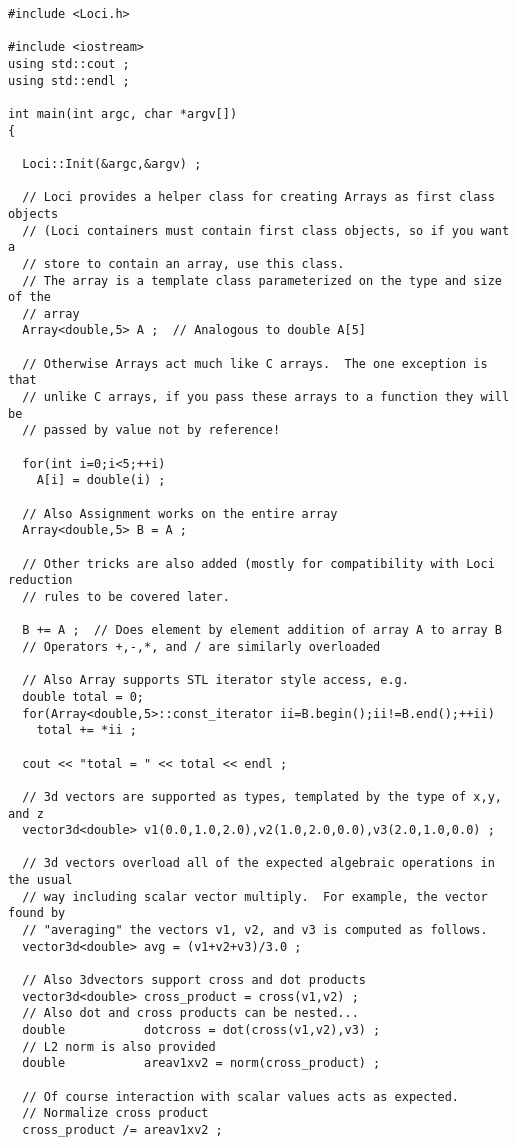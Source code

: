 \begin{verbatim}
#include <Loci.h>

#include <iostream>
using std::cout ;
using std::endl ;

int main(int argc, char *argv[])
{

  Loci::Init(&argc,&argv) ;
  
  // Loci provides a helper class for creating Arrays as first class objects
  // (Loci containers must contain first class objects, so if you want a
  // store to contain an array, use this class.
  // The array is a template class parameterized on the type and size of the
  // array
  Array<double,5> A ;  // Analogous to double A[5] 

  // Otherwise Arrays act much like C arrays.  The one exception is that
  // unlike C arrays, if you pass these arrays to a function they will be
  // passed by value not by reference!

  for(int i=0;i<5;++i)
    A[i] = double(i) ;

  // Also Assignment works on the entire array
  Array<double,5> B = A ;

  // Other tricks are also added (mostly for compatibility with Loci reduction
  // rules to be covered later.

  B += A ;  // Does element by element addition of array A to array B
  // Operators +,-,*, and / are similarly overloaded

  // Also Array supports STL iterator style access, e.g.
  double total = 0;
  for(Array<double,5>::const_iterator ii=B.begin();ii!=B.end();++ii)
    total += *ii ;

  cout << "total = " << total << endl ;

  // 3d vectors are supported as types, templated by the type of x,y, and z
  vector3d<double> v1(0.0,1.0,2.0),v2(1.0,2.0,0.0),v3(2.0,1.0,0.0) ;

  // 3d vectors overload all of the expected algebraic operations in the usual
  // way including scalar vector multiply.  For example, the vector found by
  // "averaging" the vectors v1, v2, and v3 is computed as follows.
  vector3d<double> avg = (v1+v2+v3)/3.0 ;

  // Also 3dvectors support cross and dot products
  vector3d<double> cross_product = cross(v1,v2) ;
  // Also dot and cross products can be nested...
  double           dotcross = dot(cross(v1,v2),v3) ;
  // L2 norm is also provided
  double           areav1xv2 = norm(cross_product) ;

  // Of course interaction with scalar values acts as expected.
  // Normalize cross product
  cross_product /= areav1xv2 ;


\end{verbatim}

